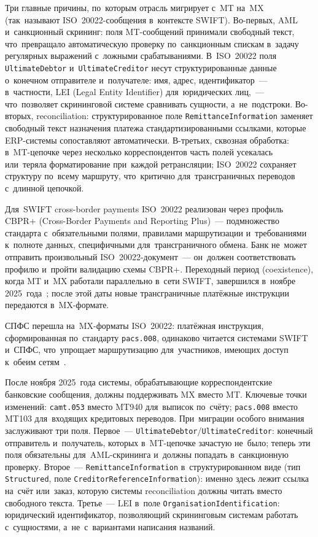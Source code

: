 Три главные причины, по~которым отрасль мигрирует с~MT на~MX (так~называют
ISO~20022-сообщения в~контексте SWIFT). Во-первых, AML и~санкционный
скрининг: поля MT-сообщений принимали свободный текст, что~превращало
автоматическую проверку по~санкционным спискам в~задачу регулярных
выражений с~ложными срабатываниями. В~ISO~20022 поля
\texttt{UltimateDebtor} и~\texttt{UltimateCreditor} несут структурированные
данные о~конечном отправителе и~получателе: имя, адрес, идентификатор~---
в~частности, LEI (Legal Entity Identifier) для~юридических лиц,~--- что~позволяет
скрининговой системе сравнивать сущности, а~не~подстроки. Во-вторых,
reconciliation: структурированное поле \texttt{RemittanceInformation}
заменяет свободный текст назначения платежа стандартизированными ссылками,
которые ERP-системы сопоставляют автоматически. В-третьих, сквозная
обработка: в~MT-цепочке через несколько корреспондентов часть полей
усекалась или~теряла форматирование при~каждой ретрансляции; ISO~20022
сохраняет структуру по~всему маршруту, что~критично для~трансграничных
переводов с~длинной цепочкой.

Для~SWIFT cross-border payments ISO~20022 реализован через профиль CBPR+
(Cross-Border Payments and Reporting Plus)~--- подмножество стандарта
с~обязательными полями, правилами маршрутизации и~требованиями к~полноте
данных, специфичными для~трансграничного обмена. Банк не~может отправить
произвольный ISO~20022-документ~--- он~должен соответствовать профилю
и~пройти валидацию схемы CBPR+. Переходный период (coexistence), когда MT и~MX
работали параллельно в~сети SWIFT, завершился в~ноябре 2025~года~;
после этой даты новые трансграничные платёжные инструкции передаются
в~MX-формате.

СПФС перешла на~MX-форматы ISO~20022: платёжная инструкция, сформированная
по~стандарту \texttt{pacs.008}, одинаково читается системами SWIFT и~СПФС,
что~упрощает маршрутизацию для~участников, имеющих доступ к~обеим
сетям~.

\begin{practice}
  После ноября 2025~года системы, обрабатывающие корреспондентские
  банковские сообщения, должны поддерживать MX вместо MT. Ключевые точки
  изменений: \texttt{camt.053} вместо MT940 для~выписок по~счёту;
  \texttt{pacs.008} вместо MT103 для~входящих кредитовых переводов.
  При~миграции особого внимания заслуживают три поля. Первое~---
  \texttt{UltimateDebtor}/\texttt{UltimateCreditor}: конечный отправитель
  и~получатель, которых в~MT-цепочке зачастую не~было; теперь эти поля
  обязательны для~AML-скрининга и~должны попадать в~санкционную проверку.
  Второе~--- \texttt{RemittanceInformation} в~структурированном виде
  (тип \texttt{Structured}, поле \texttt{CreditorReferenceInformation}):
  именно здесь лежит ссылка на~счёт или~заказ, которую системы reconciliation
  должны читать вместо свободного текста. Третье~--- LEI в~поле
  \texttt{OrganisationIdentification}: юридический идентификатор, позволяющий
  скрининговым системам работать с~сущностями, а~не~с~вариантами написания
  названий.
\end{practice}


